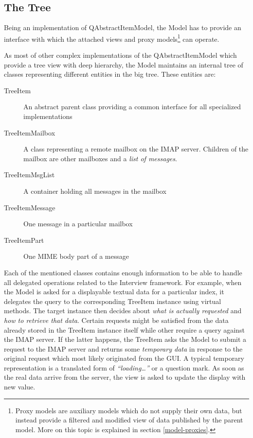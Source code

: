 \documentclass[12pt,notitlepage]{report}
\begin{document}
\subsection{The Tree}

Being an implementation of QAbstractItemModel, the Model has to provide an interface
with which the attached views and proxy models\footnote{Proxy models are
auxiliary models which do not supply their own data, but instead provide a
filtered and modified view of data published by the parent model.  More on this
topic is explained in section \ref{model-proxies}.} can operate.

As most of other complex implementations of the QAbstractItemModel which provide
a tree view with deep hierarchy, the Model maintains an internal tree of classes
representing different entities in the big tree.  These entities are:

\begin{description}
    \item[TreeItem] An abstract parent class providing a common interface for
        all specialized implementations
    \item[TreeItemMailbox] A class representing a remote mailbox on the IMAP
        server.  Children of the mailbox are other mailboxes and a {\em list of
        messages}.
    \item[TreeItemMsgList] A container holding all messages in the mailbox
    \item[TreeItemMessage] One message in a particular mailbox
    \item[TreeItemPart] One MIME body part of a message
\end{description}

Each of the mentioned classes contains enough information to be able to handle
all delegated operations related to the Interview framework.  For example, when
the Model is asked for a displayable textual data for a particular index, it
delegates the query to the corresponding TreeItem instance using virtual
methods.  The target instance then decides about {\em what is actually
requested} and {\em how to retrieve that data}.  Certain requests might be
satisfied from the data already stored in the TreeItem instance itself while
other require a query against the IMAP server.  If the latter happens, the
TreeItem asks the Model to submit a request to the IMAP server and returns some
{\em temporary data} in response to the original request which most likely
originated from the GUI.  A typical temporary representation is a translated
form of {\em ``loading\ldots''} or a question mark.  As soon as the real data
arrive from the server, the view is asked to update the display with new value.
\end{document}
